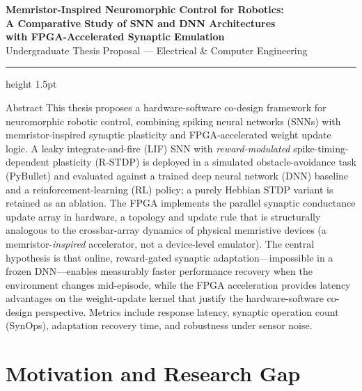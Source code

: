 \documentclass[11pt,a4paper]{article}
\begin{document}
\begin{center}
  {\LARGE\bfseries\color{accentblue}
    Memristor-Inspired Neuromorphic Control for Robotics:\\[4pt]
    A Comparative Study of SNN and DNN Architectures\\[4pt]
    with FPGA-Accelerated Synaptic Emulation}\\[1.2em]
  {\large\color{accentgray} Undergraduate Thesis Proposal --- Electrical \& Computer Engineering}\\[0.4em]
\end{center}

\vspace{0.5em}
\hrule height 1.5pt
\vspace{1.2em}

\begin{keybox}{Abstract}
This thesis proposes a hardware-software co-design framework for neuromorphic robotic
control, combining spiking neural networks (SNNs) with memristor-inspired synaptic
plasticity and FPGA-accelerated weight update logic. A leaky integrate-and-fire (LIF)
SNN with \emph{reward-modulated} spike-timing-dependent plasticity (R-STDP) is deployed
in a simulated obstacle-avoidance task (PyBullet) and evaluated against a trained deep
neural network (DNN) baseline and a reinforcement-learning (RL) policy; a purely Hebbian
STDP variant is retained as an ablation. The FPGA implements the
parallel synaptic conductance update array in hardware, a topology and update rule
that is structurally analogous to the crossbar-array dynamics of physical memristive
devices (a memristor-\emph{inspired} accelerator, not a device-level emulator). The
central hypothesis is that online, reward-gated synaptic adaptation---impossible in a
frozen DNN---enables measurably faster performance recovery when the environment changes
mid-episode, while the FPGA acceleration provides latency advantages on the
weight-update kernel that justify the hardware-software co-design perspective.
Metrics include response latency, synaptic operation count (SynOps), adaptation
recovery time, and robustness under sensor noise.
\end{keybox}

\vspace{1em}

\section{Motivation and Research Gap}
\end{document}
